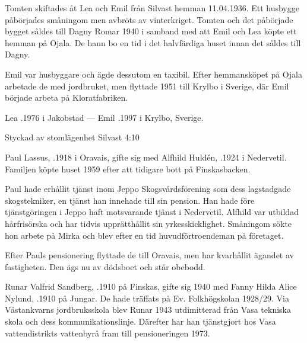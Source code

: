 Tomten skiftades åt Lea och Emil från Silvast hemman 11.04.1936. Ett husbygge påbörjades småningom men avbröts av vinterkriget. Tomten och det påbörjade bygget såldes till Dagny Romar 1940 i samband med att Emil och Lea köpte ett hemman på Ojala. De hann bo en tid i det halvfärdiga huset innan det såldes till Dagny.

Emil var husbyggare och ägde dessutom en taxibil. Efter hemmansköpet på Ojala arbetade de med jordbruket, men flyttade 1951 till Krylbo i Sverige, där Emil började arbeta på Kloratfabriken.

Lea .1976 i Jakobstad  ---  Emil .1997 i Krylbo, Sverige.



Styckad av stomlägenhet Silvast 4:10


Paul Lassus, .1918 i Oravais, gifte sig med Alfhild Huldén, .1924 i Nedervetil. Familjen köpte huset 1959 efter att tidigare bott på Finskasbacken.

Paul hade erhållit tjänst inom Jeppo Skogsvårdsförening som dess lagstadgade skogstekniker, en tjänst han innehade till sin pension. Han hade före tjänstgöringen i Jeppo haft motsvarande tjänst i Nedervetil. Alfhild var utbildad hårfrisörska och har tidvis upprätthållit sin yrkesskicklighet. Småningom sökte hon arbete på Mirka och blev efter en tid huvudförtroendeman på företaget.

Efter Pauls pensionering flyttade de till Oravais, men har kvarhållit ägandet av fastigheten. Den ägs nu av dödsboet och står obebodd.
\begin{jhchildren}
  \item {}
  \item {}
  \item {}
  \item {}
\end{jhchildren}


Runar Valfrid Sandberg, .1910 på Finskas, gifte sig 1940 med Fanny Hilda Alice Nylund, .1910 på Jungar. De hade träffats på Ev. Folkhögskolan 1928/29. Via Västankvarns jordbruksskola blev Runar 1943 utdimitterad från Vasa tekniska skola och dess kommunikationslinje. Därefter har han tjänstgjort hos Vasa vattendistrikts vattenbyrå fram till pensioneringen 1973.

